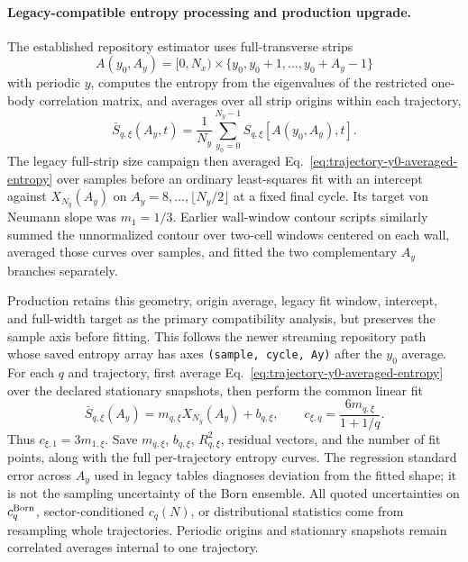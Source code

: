 \documentclass[aps,prx,twocolumn,floatfix,nofootinbib,superscriptaddress,longbibliography]{revtex4-2}
\newcommand{\code}[1]{\texttt{#1}}
\begin{document}
\paragraph*{Legacy-compatible entropy processing and production upgrade.}
The established repository estimator uses full-transverse strips
\begin{equation}
 A(y_0,A_y)=[0,N_x)\times\{y_0,y_0+1,\ldots,y_0+A_y-1\}
 \label{eq:legacy-strip-region}
\end{equation}
with periodic $y$, computes the entropy from the eigenvalues of the restricted one-body
correlation matrix, and averages over all strip origins within each trajectory,
\begin{equation}
 \bar S_{q,\xi}(A_y,t)=\frac1{N_y}\sum_{y_0=0}^{N_y-1}
 S_{q,\xi}\!\left[A(y_0,A_y),t\right].
 \label{eq:trajectory-y0-averaged-entropy}
\end{equation}
The legacy full-strip size campaign then averaged
Eq.~\eqref{eq:trajectory-y0-averaged-entropy} over samples before an ordinary
least-squares fit with an intercept against $X_{N_y}(A_y)$ on
$A_y=8,\ldots,\lfloor N_y/2\rfloor$ at a fixed final cycle.  Its target von Neumann
slope was $m_1=1/3$.  Earlier wall-window contour scripts similarly summed the
unnormalized contour over two-cell windows centered on each wall, averaged those curves
over samples, and fitted the two complementary $A_y$ branches separately.

Production retains this geometry, origin average, legacy fit window, intercept, and
full-width target as the primary compatibility analysis, but preserves the sample axis
before fitting.  This follows the newer streaming repository path whose saved entropy
array has axes \code{(sample, cycle, Ay)} after the $y_0$ average.  For each $q$ and
trajectory, first average Eq.~\eqref{eq:trajectory-y0-averaged-entropy} over the declared
stationary snapshots, then perform the common linear fit
\begin{equation}
 \bar S_{q,\xi}(A_y)=m_{q,\xi}X_{N_y}(A_y)+b_{q,\xi},
 \qquad
 c_{\xi,q}=\frac{6m_{q,\xi}}{1+1/q}.
 \label{eq:trajectory-central-charge-fit}
\end{equation}
Thus $c_{\xi,1}=3m_{1,\xi}$.  Save $m_{q,\xi}$, $b_{q,\xi}$, $R^2_{q,\xi}$, residual
vectors, and the number of fit points, along with the full per-trajectory entropy curves.
The regression standard error across $A_y$ used in legacy tables diagnoses deviation from
the fitted shape; it is not the sampling uncertainty of the Born ensemble.  All quoted
uncertainties on $c_q^{\rm Born}$, sector-conditioned $c_q(N)$, or distributional
statistics come from resampling whole trajectories.  Periodic origins and stationary
snapshots remain correlated averages internal to one trajectory.
\end{document}
